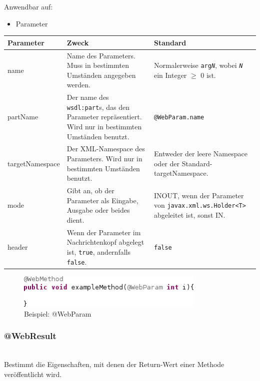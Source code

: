 \documentclass[runningheads]{llncs}
\newcommand{\anntabwidth}{\textwidth}
\begin{document}
      \noindent{}Anwendbar auf:
      \begin{itemize}
       \item Parameter\vfill
      \end{itemize}
    \begin{tabulary}{\anntabwidth}{|l|L|L|}
    \hline
    \textbf{Parameter} & \textbf{Zweck} & \textbf{Standard} \\
    \hline
      name &
      Name des Parameters. Muss in bestimmten Umständen angegeben werden. &
      Normalerweise \texttt{arg\textit{N}}, wobei \texttt{\textit{N}} ein Integer $\geq$ 0 ist. \\
    \hline
      partName &
      Der name des \texttt{wsdl:part}s, das den Parameter repräsentiert. Wird nur in bestimmten
      Umständen benutzt. &
      \texttt{@WebParam.name} \\
    \hline
      targetNamespace &
      Der XML-Namespace des Parameters. Wird nur in bestimmten Umständen benutzt. &
      Entweder der leere Namespace oder der Standard-targetNamespace. \\
    \hline
      mode &
      Gibt an, ob der Parameter als Eingabe, Ausgabe oder beides dient. &
      INOUT, wenn der Parameter von \texttt{javax.xml.ws.Holder<T>} abgeleitet ist, sonst IN. \\
    \hline
      header &
      Wenn der Parameter im Nachrichtenkopf abgelegt ist, \texttt{true}, andernfalls
      \texttt{false}. &
      \texttt{false} \\
    \hline
    \end{tabulary} \vfill
    \begin{figure}[tbh]
      \centering
      \includegraphics[width=0.8\textwidth]{../images/AtWebParam.png}
      \caption{Beispiel: @WebParam}
      \label{fig:wp}
    \end{figure} \vfill

    \subsubsection{@WebResult}\ \\
      Bestimmt die Eigenschaften, mit denen der Return-Wert einer Methode veröffentlicht wird.
\end{document}
